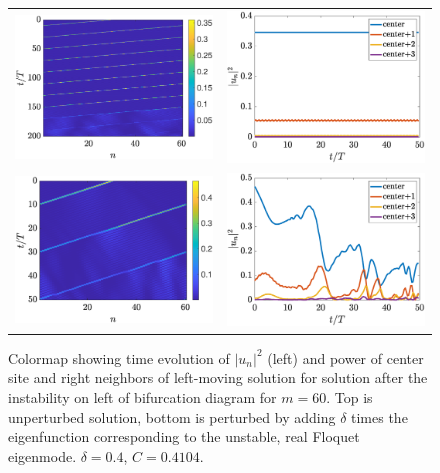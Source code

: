 \documentclass{article}
\begin{document}
\begin{figure}[H]
    \centering
    \begin{tabular}{cc}
    \includegraphics[width=7cm]{leftafterinstabilityLtimestep} &
    \includegraphics[width=7cm]{leftafterinstabilityLpower} \\ 
    \includegraphics[width=7cm]{leftafterinstabilityLperttimestep} &
    \includegraphics[width=7cm]{leftafterinstabilityLpertpower}
    \end{tabular}
    \caption{Colormap showing time evolution of $|u_n|^2$ (left) and power of center site and right neighbors of left-moving solution for solution after the instability on left of bifurcation diagram for $m=60$. Top is unperturbed solution, bottom is perturbed by adding $\delta$ times the eigenfunction corresponding to the unstable, real Floquet eigenmode. $\delta = 0.4$, $C=0.4104$. }
    \label{fig:leftinstabLpert}
\end{figure}
\end{document}
